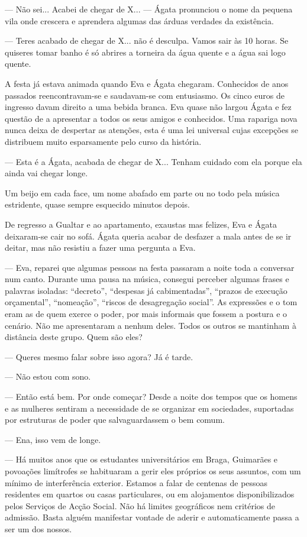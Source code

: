 --- Não sei... Acabei de chegar de X... --- Ágata pronunciou o nome da
  pequena vila onde crescera e aprendera algumas das árduas verdades
  da existência.

--- Teres acabado de chegar de X... não é desculpa. Vamos sair às 10
  horas. Se quiseres tomar banho é só abrires a torneira da água quente
  e a água sai logo quente.

A festa já estava animada quando Eva e Ágata chegaram. Conhecidos de
anos passados reencontravam-se e saudavam-se com entusiasmo. Os cinco
euros de ingresso davam direito a uma bebida branca. Eva quase não
largou Ágata e fez questão de a apresentar a todos os seus amigos e
conhecidos. Uma rapariga nova nunca deixa de despertar as atenções,
esta é uma lei universal cujas excepções se distribuem muito esparsamente pelo
curso da história.

--- Esta é a Ágata, acabada de chegar de X... Tenham cuidado com ela
  porque ela ainda vai chegar longe.

Um beijo em cada face, um nome abafado em parte ou no todo pela música
estridente, quase sempre esquecido minutos depois.

De regresso a Gualtar e ao apartamento, exaustas mas felizes, Eva e
Ágata deixaram-se cair no sofá. Ágata queria acabar de desfazer a mala
antes de se ir deitar, mas não resistiu a fazer uma pergunta a Eva.

--- Eva, reparei que algumas pessoas na festa passaram a noite toda a
  conversar num canto. Durante uma pausa na música, consegui perceber
  algumas frases e palavras isoladas: ``decreto'', ``despesas já
  cabimentadas'', ``prazos de execução orçamental'', ``nomeação'',
  ``riscos de desagregação social''. As expressões e o tom eram as de
  quem exerce o poder, por mais informais que fossem a postura e o
  cenário. Não me apresentaram a nenhum deles. Todos os outros se
  mantinham à distância deste grupo. Quem são eles?

--- Queres mesmo falar sobre isso agora? Já é tarde.

--- Não estou com sono.

--- Então está bem. Por onde começar? Desde a noite dos tempos que os
  homens e as mulheres sentiram a necessidade de se organizar em
  sociedades, suportadas por estruturas de poder que salvaguardassem o
  bem comum.

--- Ena, isso vem de longe.

--- Há muitos anos que os estudantes universitários em Braga, Guimarães e
  povoações limítrofes se habituaram a gerir eles próprios os seus
  assuntos, com um mínimo de interferência exterior. Estamos a falar
  de centenas de pessoas residentes em quartos ou casas
  particulares, ou em alojamentos disponibilizados
pelos Serviços de Acção Social. Não há limites geográficos nem
critérios de admissão. Basta alguém manifestar vontade de aderir e
automaticamente passa a ser um dos nossos.

